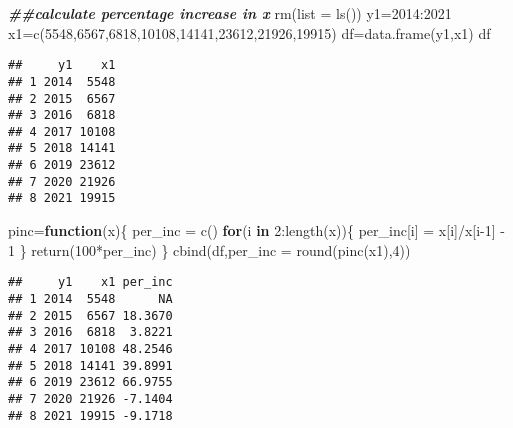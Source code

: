 \documentclass[
]{article}
\newenvironment{Shaded}{\begin{snugshade}}{\end{snugshade}}
\newcommand{\AttributeTok}[1]{\textcolor[rgb]{0.77,0.63,0.00}{#1}}
\newcommand{\ControlFlowTok}[1]{\textcolor[rgb]{0.13,0.29,0.53}{\textbf{#1}}}
\newcommand{\DecValTok}[1]{\textcolor[rgb]{0.00,0.00,0.81}{#1}}
\newcommand{\DocumentationTok}[1]{\textcolor[rgb]{0.56,0.35,0.01}{\textbf{\textit{#1}}}}
\newcommand{\FunctionTok}[1]{\textcolor[rgb]{0.00,0.00,0.00}{#1}}
\newcommand{\NormalTok}[1]{#1}
\newcommand{\OtherTok}[1]{\textcolor[rgb]{0.56,0.35,0.01}{#1}}
\newcommand{\SpecialCharTok}[1]{\textcolor[rgb]{0.00,0.00,0.00}{#1}}
\begin{document}
\begin{Shaded}
\begin{Highlighting}[]
\DocumentationTok{\#\#calculate percentage increase in x}
\FunctionTok{rm}\NormalTok{(}\AttributeTok{list =} \FunctionTok{ls}\NormalTok{())}
\NormalTok{y1}\OtherTok{=}\DecValTok{2014}\SpecialCharTok{:}\DecValTok{2021}
\NormalTok{x1}\OtherTok{=}\FunctionTok{c}\NormalTok{(}\DecValTok{5548}\NormalTok{,}\DecValTok{6567}\NormalTok{,}\DecValTok{6818}\NormalTok{,}\DecValTok{10108}\NormalTok{,}\DecValTok{14141}\NormalTok{,}\DecValTok{23612}\NormalTok{,}\DecValTok{21926}\NormalTok{,}\DecValTok{19915}\NormalTok{)}
\NormalTok{df}\OtherTok{=}\FunctionTok{data.frame}\NormalTok{(y1,x1)}
\NormalTok{df}
\end{Highlighting}
\end{Shaded}

\begin{verbatim}
##     y1    x1
## 1 2014  5548
## 2 2015  6567
## 3 2016  6818
## 4 2017 10108
## 5 2018 14141
## 6 2019 23612
## 7 2020 21926
## 8 2021 19915
\end{verbatim}

\begin{Shaded}
\begin{Highlighting}[]
\NormalTok{pinc}\OtherTok{=}\ControlFlowTok{function}\NormalTok{(x)\{}
\NormalTok{  per\_inc }\OtherTok{=} \FunctionTok{c}\NormalTok{()}
  \ControlFlowTok{for}\NormalTok{(i }\ControlFlowTok{in} \DecValTok{2}\SpecialCharTok{:}\FunctionTok{length}\NormalTok{(x))\{}
\NormalTok{    per\_inc[i] }\OtherTok{=}\NormalTok{ x[i]}\SpecialCharTok{/}\NormalTok{x[i}\DecValTok{{-}1}\NormalTok{] }\SpecialCharTok{{-}} \DecValTok{1}
\NormalTok{  \}}
  \FunctionTok{return}\NormalTok{(}\DecValTok{100}\SpecialCharTok{*}\NormalTok{per\_inc)}
\NormalTok{\}}
\FunctionTok{cbind}\NormalTok{(df,}\AttributeTok{per\_inc =} \FunctionTok{round}\NormalTok{(}\FunctionTok{pinc}\NormalTok{(x1),}\DecValTok{4}\NormalTok{))}
\end{Highlighting}
\end{Shaded}

\begin{verbatim}
##     y1    x1 per_inc
## 1 2014  5548      NA
## 2 2015  6567 18.3670
## 3 2016  6818  3.8221
## 4 2017 10108 48.2546
## 5 2018 14141 39.8991
## 6 2019 23612 66.9755
## 7 2020 21926 -7.1404
## 8 2021 19915 -9.1718
\end{verbatim}
\end{document}
